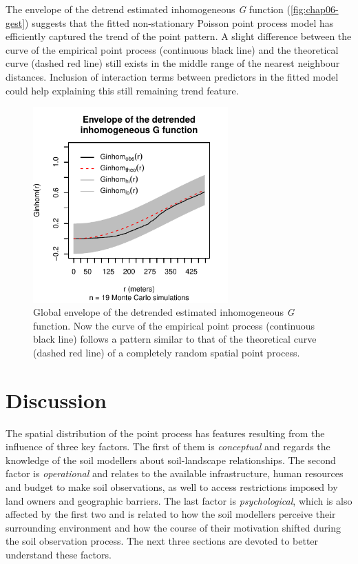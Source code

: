 The envelope of the detrend estimated inhomogeneous \emph{G} function (\autoref{fig:chap06-gest}) suggests 
that the fitted non-stationary Poisson point process model has efficiently captured the trend of the point 
pattern. A slight difference between the curve of the empirical point process (continuous black line) and the 
theoretical curve (dashed red line) still exists in the middle range of the nearest neighbour distances. 
Inclusion of interaction terms between predictors in the fitted model could help explaining this still 
remaining trend feature.

\begin{figure}[!h]
 \centering
 \includegraphics[trim=0mm 0mm 0mm 12mm,clip=true,width=7.5cm]{fig/chap06-fit-gest-sim}
 \caption{Global envelope of the detrended estimated inhomogeneous \emph{G} function. Now the curve of the 
 empirical point process (continuous black line) follows a pattern similar to that of the theoretical curve 
 (dashed red line) of a completely random spatial point process.}
 \label{fig:chap06-trend}
\end{figure}

\section{Discussion}

The spatial distribution of the point process has features resulting from the influence of three key factors. 
The first of them is \textit{conceptual} and regards the knowledge of the soil modellers about soil-landscape 
relationships. The second factor is \textit{operational} and relates to the available infrastructure, human 
resources and budget to make soil observations, as well to access restrictions imposed by land owners and 
geographic barriers. The last factor is \textit{psychological}, which is also affected by the first two and is 
related to how the soil modellers perceive their surrounding environment and how the course of their 
motivation shifted during the soil observation process. The next three sections are devoted to better 
understand these factors.

